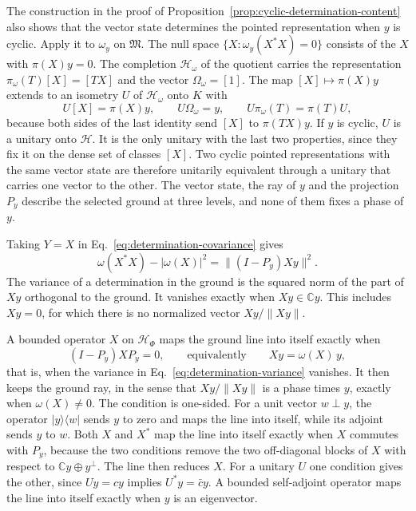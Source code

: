 \documentclass[11pt]{article}
\theoremstyle{definition}
\newcommand{\C}{\mathbb C}
\newcommand{\ket}[1]{\lvert #1\rangle}
\newcommand{\bra}[1]{\langle #1\rvert}
\begin{document}
The construction in the proof of Proposition~\ref{prop:cyclic-determination-content} also shows that the vector state determines the pointed representation when $y$ is cyclic. Apply it to $\omega_y$ on $\mathfrak M$. The null space $\{X:\omega_y(X^*X)=0\}$ consists of the $X$ with $\pi(X)y=0$. The completion $\mathcal H_\omega$ of the quotient carries the representation $\pi_\omega(T)[X]=[TX]$ and the vector $\Omega_\omega=[1]$. The map $[X]\mapsto\pi(X)y$ extends to an isometry $U$ of $\mathcal H_\omega$ onto $K$ with
\begin{equation}
 U[X]=\pi(X)y,\qquad U\Omega_\omega=y,\qquad U\pi_\omega(T)=\pi(T)U ,
 \label{eq:gns-intertwiner}
\end{equation}
because both sides of the last identity send $[X]$ to $\pi(TX)y$. If $y$ is cyclic, $U$ is a unitary onto $\mathcal H$. It is the only unitary with the last two properties, since they fix it on the dense set of classes $[X]$. Two cyclic pointed representations with the same vector state are therefore unitarily equivalent through a unitary that carries one vector to the other. The vector state, the ray of $y$ and the projection $P_y$ describe the selected ground at three levels, and none of them fixes a phase of $y$.

Taking $Y=X$ in Eq.~\eqref{eq:determination-covariance} gives
\begin{equation}
 \omega(X^*X)-|\omega(X)|^2=\bigl\|(I-P_y)Xy\bigr\|^2 .
 \label{eq:determination-variance}
\end{equation}
The variance of a determination in the ground is the squared norm of the part of $Xy$ orthogonal to the ground. It vanishes exactly when $Xy\in\C y$. This includes $Xy=0$, for which there is no normalized vector $Xy/\|Xy\|$.

A bounded operator $X$ on $\mathcal H_\Phi$ maps the ground line into itself exactly when
\begin{equation}
 (I-P_y)XP_y=0,\qquad\text{equivalently}\qquad Xy=\omega(X)\,y ,
 \label{eq:ground-line-kept}
\end{equation}
that is, when the variance in Eq.~\eqref{eq:determination-variance} vanishes. It then keeps the ground ray, in the sense that $Xy/\|Xy\|$ is a phase times $y$, exactly when $\omega(X)\ne0$. The condition is one-sided. For a unit vector $w\perp y$, the operator $\ket{y}\!\bra{w}$ sends $y$ to zero and maps the line into itself, while its adjoint sends $y$ to $w$. Both $X$ and $X^*$ map the line into itself exactly when $X$ commutes with $P_y$, because the two conditions remove the two off-diagonal blocks of $X$ with respect to $\C y\oplus y^\perp$. The line then reduces $X$. For a unitary $U$ one condition gives the other, since $Uy=cy$ implies $U^*y=\bar cy$. A bounded self-adjoint operator maps the line into itself exactly when $y$ is an eigenvector.
\end{document}
